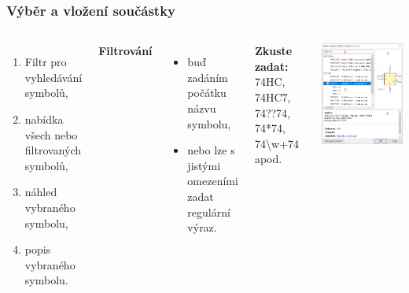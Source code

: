 \documentclass{beamer}
\begin{document}
\begin{frame}
	\frametitle{Výběr a vložení součástky}
	\begin{columns}
	
		\small
		\begin{enumerate}
			\item Filtr pro vyhledávání symbolů,
			\item nabídka všech nebo filtrovaných symbolů,
			\item náhled vybraného symbolu,
			\item popis vybraného symbolu.
		\end{enumerate}
		
		\textbf{Filtrování}
		\begin{itemize}
			\item buď zadáním počátku názvu symbolu,
			\item nebo lze s jistými omezeními zadat regulární výraz.
		\end{itemize}
		
		\textbf{Zkuste zadat:} 74HC, 74HC7, 74??74, 74*74, 74\textbackslash w+74 apod.
		
		\begin{center}
			\includegraphics[width=\textwidth]{obr/umisti_soucastku02.png}
		\end{center}
		
	\end{columns}
\end{frame}
\end{document}
